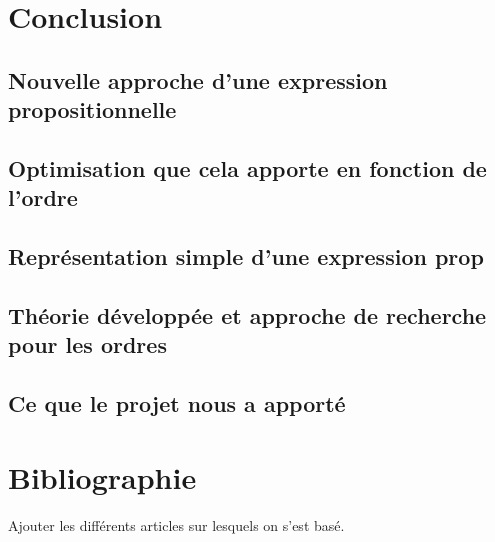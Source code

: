 \documentclass[a4paper, oneside]{report}
\begin{document}
\chapter*{Conclusion}

\section*{Nouvelle approche d'une expression propositionnelle}
\section*{Optimisation que cela apporte en fonction de l'ordre}
\section*{Représentation simple d'une expression prop}
\section*{Théorie développée et approche de recherche pour les ordres}
\section*{Ce que le projet nous a apporté}

\chapter*{Bibliographie}
Ajouter les différents articles sur lesquels on s'est basé.
\end{document}

